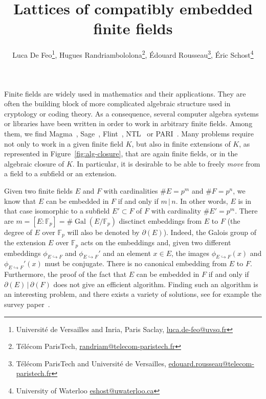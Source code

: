 \documentclass[12pt]{article}
\title{Lattices of compatibly embedded finite fields}
\author{Luca De Feo\footnote{
    Université de Versailles and Inria, Paris Saclay,
    \url{luca.de-feo@uvsq.fr}
  },
  Hugues Randriambololona\footnote{
    Télécom ParisTech,
    \url{randriam@telecom-paristech.fr}
  },
  Édouard Rousseau\footnote{
    Télécom ParisTech and Université de Versailles,
    \url{edouard.rousseau@telecom-paristech.fr}
  },
  Éric Schost\footnote{
    University of Waterloo
    \url{eshost@uwaterloo.ca}
  }
}
\DeclareMathOperator{\Gal}{Gal}
\newcommand{\dE}{\partial(E)}
\newcommand{\dF}{\partial(F)}
\newcommand{\embed}[2]{\phi_{#1\hookrightarrow#2}}
\begin{document}
\maketitle

Finite fields are widely used in mathematics and their applications. They are
often the building block of more complicated algebraic structure used in
cryptology or coding theory. As a
consequence, several computer algebra systems or libraries have been written in
order to work in arbitrary finite fields. Among them, we find
Magma~\cite{Magma}, Sage~\cite{Sagemath}, Flint~\cite{Flint}, NTL~\cite{NTL} or
PARI~\cite{Pari}. Many problems require not only to work in a given finite field
$K$, but also in finite extensions of $K$, as represented in
Figure~\ref{fig:alg-closure}, that are again finite fields, or in
the algebraic closure of $K$. In particular, it is desirable to be able to
freely \emph{move} from a field to a subfield or an extension.

Given two finite fields $E$ and $F$ with cardinalities $\#E=p^{m}$ and
$\#F=p^{n}$, we know that $E$ can be embedded in $F$ if and only if $m\,|\,n$.
In other words, $E$ is in that case isomorphic to a subfield $E'\subset F$ of
$F$ with
cardinality $\#E'=p^{m}$. There are
$m=[E:\mathbb{F}_p]=\#\Gal(E/\mathbb{F}_p)$ disctinct embeddings from $E$ to
$F$ (the degree of $E$ over $\mathbb{F}_p$ will also be denoted by
$\partial(E)$). Indeed, the Galois group of the extension $E$ over
$\mathbb{F}_p$ acts
on the embeddings and, given two different embeddings $\embed{E}{F}$ and
$\embed{E}{F}'$ and an element $x\in E$, the images $\embed{E}{F}(x)$ and
$\embed{E}{F}'(x)$ must be conjugate. There is no canonical
embedding from $E$ to $F$. Furthermore, the proof of the fact that $E$ can be
embedded in $F$ if and only if $\dE\,|\,\dF$ does not give an efficient
algorithm. Finding such an algorithm is an interesting problem, and there exists
a variety of solutions, see for example the survey paper~\cite{BDDFS17}.
\end{document}
